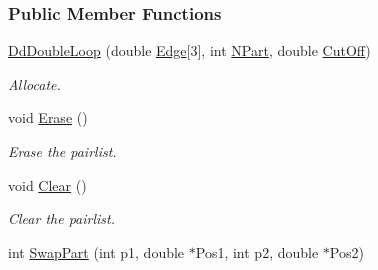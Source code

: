 \subsubsection*{Public Member Functions}
\begin{DoxyCompactItemize}
\item 
\hyperlink{classDdDoubleLoop_ac6bab403b0b1578fcb14b996b377d10f}{Dd\+Double\+Loop} (double \hyperlink{classDomDecBasics_a8895c89605e91c6cf7430bad336f77c6}{Edge}\mbox{[}3\mbox{]}, int \hyperlink{classDomDecBasics_abdcc792391d8c5092471dff191de47f4}{N\+Part}, double \hyperlink{classDomDecBasics_af2411aba2dd63fa22b1bc279653ff7a0}{Cut\+Off})
\begin{DoxyCompactList}\small\item\em Allocate. \end{DoxyCompactList}\item 
void \hyperlink{classDdDoubleLoop_a98ae2e78109ea826eea71da14c37ce95}{Erase} ()
\begin{DoxyCompactList}\small\item\em Erase the pairlist. \end{DoxyCompactList}\item 
void \hyperlink{classDdDoubleLoop_aa71d36872f416feaa853788a7a7a7ef8}{Clear} ()\hypertarget{classDdDoubleLoop_aa71d36872f416feaa853788a7a7a7ef8}{}\label{classDdDoubleLoop_aa71d36872f416feaa853788a7a7a7ef8}

\begin{DoxyCompactList}\small\item\em Clear the pairlist. \end{DoxyCompactList}\item 
int \hyperlink{classDdDoubleLoop_a19f169980d772f5f0df4c37de864ef48}{Swap\+Part} (int p1, double $\ast$Pos1, int p2, double $\ast$Pos2)\hypertarget{classDdDoubleLoop_a19f169980d772f5f0df4c37de864ef48}{}\label{classDdDoubleLoop_a19f169980d772f5f0df4c37de864ef48}


\end{DoxyCompactItemize}
